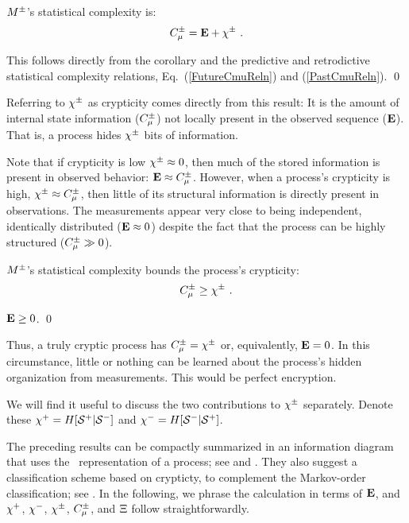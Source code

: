 \begin{The}
${M}^{\pm}$'s statistical complexity is:
\begin{equation}
C_\mu^{\pm} = {\bf E} + \chi^\pm ~.
\end{equation}
\end{The}

\begin{ProThe}
This follows directly from the corollary and the predictive and retrodictive
statistical complexity relations, Eq.~(\ref{FutureCmuReln}) and (\ref{PastCmuReln}).
\qed
\end{ProThe}

Referring to $\chi^\pm$ as crypticity comes directly from this result: It
is the amount of internal state information ($C_\mu^{\pm}$) not locally
present in the observed sequence (${\bf E}$). That is, a process hides
$\chi^\pm$ bits of information.

Note that if crypticity is low $\chi^\pm \approx 0$, then much of the stored
information is present in observed behavior: ${\bf E} \approx C_\mu^{\pm}$. However,
when a process's crypticity is high, $\chi^\pm \approx C_\mu^{\pm}$, then little of its
structural information is directly present in observations. The measurements
appear very close to being independent, identically distributed
(${\bf E} \approx 0$) despite the fact that the process can be highly structured
($C_\mu^{\pm} \gg 0$).

\begin{Cor}
${M}^{\pm}$'s statistical complexity bounds the process's crypticity:
\begin{equation}
C_\mu^{\pm} \geq \chi^\pm ~.
\end{equation}
\end{Cor}

\begin{ProCor}
${\bf E} \geq 0$.
\qed
\end{ProCor}

Thus, a truly cryptic process has $C_\mu^{\pm} = \chi^\pm$ or, equivalently, ${\bf E} = 0$.
In this circumstance, little or nothing can be learned about the process's
hidden organization from measurements. This would be perfect encryption.

We will find it useful to discuss the two contributions to $\chi^\pm$ separately.
Denote these \mbox{$\chi^+ = H[{\mathcal{S}}^{+}|{\mathcal{S}}^{-}]$} and
\mbox{$\chi^- = H[{\mathcal{S}}^{-}|{\mathcal{S}}^{+}]$}.

The preceding results can be compactly summarized in an information diagram
that uses the \eM\ representation of a process; see  and
. They also suggest a classification scheme based on crypticty,
to complement the Markov-order classification; see . In the 
following, we phrase the calculation
in terms of ${\bf E}$, and $\chi^+$, $\chi^-$, $\chi^\pm$, $C_\mu^{\pm}$, and $\Xi$ 
follow straightforwardly.




